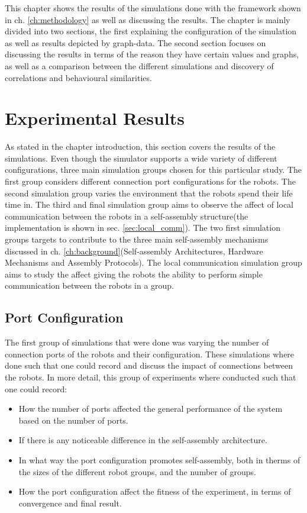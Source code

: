 This chapter shows the results of the simulations done with the framework shown in ch. \ref{ch:methodology} as well as discussing the results.
The chapter is mainly divided into two sections, the first explaining the configuration of the simulation as well as results depicted by graph-data.
The second section focuses on discussing the results in terms of the reason they have certain values and graphs, as well as a comparison between the different simulations and discovery of correlations and behavioural similarities.

\section{Experimental Results}
As stated in the chapter introduction, this section covers the results of the simulations. 
Even though the simulator supports a wide variety of different configurations, three main simulation groups chosen for this particular study.
The first group considers different connection port configurations for the robots.
The second simulation group varies the environment that the robots spend their life time in.
The third and final simulation group aims to observe the affect of local communication between the robots in a self-assembly structure(the implementation is shown in sec. \ref{sec:local_comm}).
The two first simulation groups targets to contribute to the three main self-assembly mechanisms discussed in ch. \ref{ch:background}(Self-assembly Architectures, Hardware Mechanisms and Assembly Protocols).
The local communication simulation group aims to study the affect giving the robots the ability to perform simple communication between the robots in a group.

\subsection{Port Configuration}
The first group of simulations that were done was varying the number of connection ports of the robots and their configuration.
These simulations where done such that one could record and discuss the impact of connections between the robots.
In more detail, this group of experiments where conducted such that one could record:

\begin{itemize}
	\item How the number of ports affected the general performance of the system based on the number of ports.
	\item If there is any noticeable difference in the self-assembly architecture.
	\item In what way the port configuration promotes self-assembly, both in therms of the sizes of the different robot groups, and the number of groups.
	\item How the port configuration affect the fitness of the experiment, in terms of convergence and final result.
\end{itemize}

